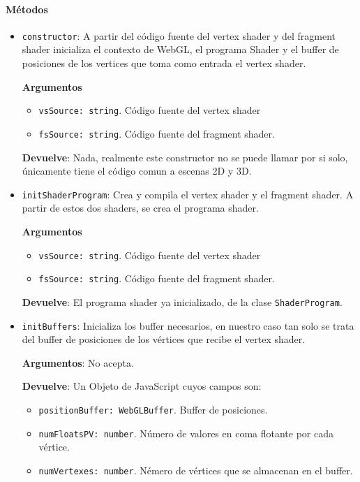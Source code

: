\paragraph*{Métodos}
\begin{itemize}
    \item \verb|constructor|: A partir del código fuente del vertex shader y del fragment shader inicializa el contexto de WebGL, el programa Shader y el buffer de posiciones de los vertices que toma como entrada el vertex shader.
    
    \textbf{Argumentos}
    \begin{itemize}
        \item \verb|vsSource: string|. Código fuente del vertex shader
        \item \verb|fsSource: string|. Código fuente del fragment shader.
    \end{itemize}
    
    \textbf{Devuelve}: Nada, realmente este constructor no se puede llamar por si solo, únicamente tiene el código comun a escenas 2D y 3D.
    
    \item \verb|initShaderProgram|: Crea y compila el vertex shader y el fragment shader. A partir de estos dos shaders, se crea el programa shader.
    
    \textbf{Argumentos}
    \begin{itemize}
        \item \verb|vsSource: string|. Código fuente del vertex shader
        \item \verb|fsSource: string|. Código fuente del fragment shader.
    \end{itemize}
    
    \textbf{Devuelve}: El programa shader ya inicializado, de la clase \verb|ShaderProgram|.

    \item \verb|initBuffers|: Inicializa los buffer necesarios, en nuestro caso tan solo se trata del buffer de posiciones de los vértices que recibe el vertex shader.
    
    \textbf{Argumentos}: No acepta.
    
    \textbf{Devuelve}: Un Objeto de JavaScript cuyos campos son:
    \begin{itemize}
        \item \verb|positionBuffer: WebGLBuffer|. Buffer de posiciones.
        \item \verb|numFloatsPV: number|. Número de valores en coma flotante por cada vértice.
        \item \verb|numVertexes: number|. Némero de vértices que se almacenan en el buffer.
    \end{itemize}


\end{itemize}
